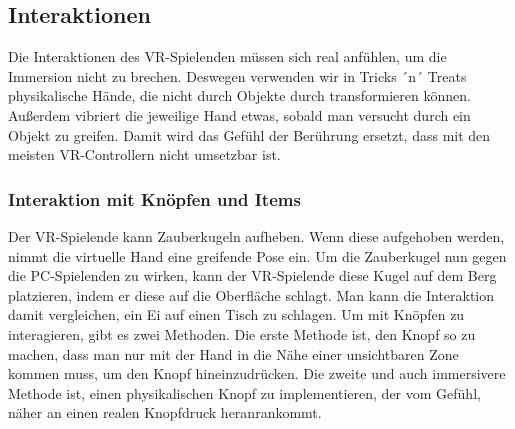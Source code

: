 \subsection{Interaktionen}
Die Interaktionen des VR-Spielenden müssen sich real anfühlen, um die Immersion nicht zu brechen. Deswegen verwenden wir in Tricks ´n´ Treats physikalische Hände, die nicht durch Objekte durch transformieren können. Außerdem vibriert die jeweilige Hand etwas, sobald man versucht durch ein Objekt zu greifen. Damit wird das Gefühl der Berührung ersetzt, dass mit den meisten VR-Controllern nicht umsetzbar ist.

\subsubsection{Interaktion mit Knöpfen und Items}
Der VR-Spielende kann Zauberkugeln aufheben. Wenn diese aufgehoben werden, nimmt die virtuelle Hand eine greifende Pose ein. Um die Zauberkugel nun gegen die PC-Spielenden zu wirken, kann der VR-Spielende diese Kugel auf dem Berg platzieren, indem er diese auf die Oberfläche schlagt. Man kann die Interaktion damit vergleichen, ein Ei auf einen Tisch zu schlagen. Um mit Knöpfen zu interagieren, gibt es zwei Methoden. Die erste Methode ist, den Knopf so zu machen, dass man nur mit der Hand in die Nähe einer unsichtbaren Zone kommen muss, um den Knopf hineinzudrücken. Die zweite und auch immersivere Methode ist, einen physikalischen Knopf zu implementieren, der vom Gefühl, näher an einen realen Knopfdruck heranrankommt.